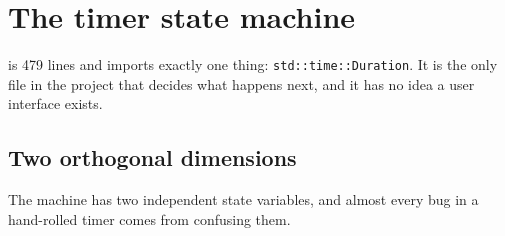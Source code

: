 \clearpage
\section{The timer state machine}

 is 479 lines and imports exactly one thing:
\texttt{std::time::Duration}. It is the only file in the project that decides what
happens next, and it has no idea a user interface exists.

\subsection{Two orthogonal dimensions}

The machine has two independent state variables, and almost every bug in a hand-rolled
timer comes from confusing them.

